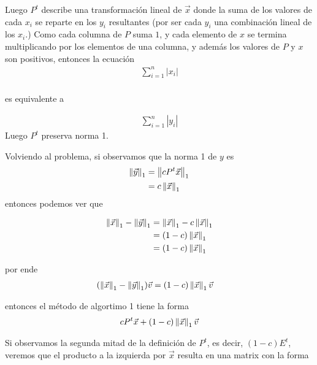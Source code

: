 Luego $P^{t}$ describe una transformación lineal de $\vec{x}$ donde la suma de los valores de cada $x_i$
se reparte en los $y_i$ resultantes (por ser cada $y_i$ una combinación lineal de los $x_i$.) 
Como cada columna de $P$ suma $1$, y cada elemento de $x$  se termina
multiplicando por los elementos de una columna, y además los valores de $P$ y $ x$  son positivos,
entonces la ecuación
\begin{align*}
\sum_{i=1}^{n} |x_i| \\
\end{align*}
\centerline{es equivalente a}
\begin{align*}
\sum_{i=1}^{n} |y_i|
\end{align*}
Luego $P^{t}$ preserva norma 1.

Volviendo al problema, si observamos que la norma 1 de $y$  es
\begin{align*}
\left\|\vec{y}\right\|_1 &= \left\|cP^{t} \vec{x}\right\|_1 \\
               &= c\left\|\vec{x}\right\|_1
\end{align*}
entonces podemos ver que

\begin{align*}
\left\|\vec{x}\right\|_1 - \left\|\vec{y}\right\|_1 &= \left\|\vec{x}\right\|_1 - c \left\|\vec{x}\right\|_1 \\
                                        &= (1-c) \left\|\vec{x}\right\|_1 \\
                                        &= (1-c) \left\|\vec{x}\right\|_1
\end{align*}

por ende
\begin{align*}
(\left\|\vec{x}\right\|_1 - \left\|\vec{y}\right\|_1)\vec{v} &= (1-c) \left\|\vec{x}\right\|_1 \vec{v}
\end{align*}

entonces el método de algortimo 1 tiene la forma
\begin{align*}
cP^{t}\vec{x} + (1-c) \left\|\vec{x}\right\|_1 \vec{v}
\end{align*}

Si observamos la segunda mitad de la definición de $P^{t}$, es decir, $(1-c)E^{t}$, veremos que el producto
a la izquierda por $\vec{x}$ resulta en una matrix con la forma

